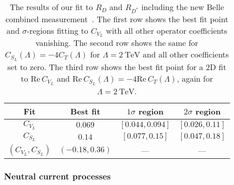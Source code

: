 \begin{table}[t]
    \centering
    \begin{tabular}{c|ccc}
      \toprule
      Fit & Best fit & $1\sigma$ region & $2\sigma$ region \\
      \midrule
      $C_{V_L}$  & $0.069$ & $[0.044, 0.094]$ & $[0.026, 0.11]$ \\
      $C_{S_L}$ & $0.14$ & $[0.077, 0.15]$ & $[0.047, 0.18]$ \\
      $(C_{V_L}, C_{S_L})$ & $(-0.18, 0.36)$ & --- & --- \\
      \bottomrule
    \end{tabular}
    \caption{The results of our fit to $R_D$ and $R_{D^*}$ including the new
      Belle combined measurement~\cite{Abdesselam:2019dgh}. The first row shows
      the best fit point and $\sigma$-regions fitting to $C_{V_L}$ with all
      other operator coefficients vanishing. The second row shows the same for
      $C_{S_L}(\Lambda) = -4 C_T(\Lambda)$ for $\Lambda = \SI{2}{\TeV}$ and all
      other coefficients set to zero. The third row shows the best fit point for
      a 2D fit to $\text{Re}\, C_{V_L}$ and
      $\text{Re}\, C_{S_L}(\Lambda)= -4 \text{Re}\, C_T(\Lambda)$, again for
      $\Lambda = \SI{2}{\TeV}$.}
    \label{tab:ch3-fitresults}
\end{table}

\subsubsection{Neutral current processes}
\label{sec:ch3-neutralcurrentprocesses}

